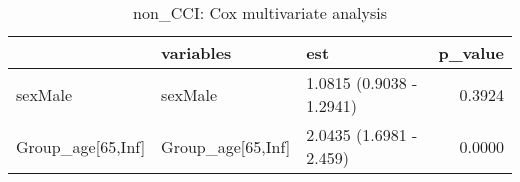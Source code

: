 \begin{table}

\caption{non_CCI: Cox multivariate analysis}
\centering
\begin{tabular}[t]{l|l|l|r}
\hline
  & variables & est & p\_value\\
\hline
sexMale & sexMale & 1.0815 (0.9038 - 1.2941) & 0.3924\\
\hline
Group\_age[65,Inf] & Group\_age[65,Inf] & 2.0435 (1.6981 - 2.459) & 0.0000\\
\hline
\end{tabular}
\end{table}
